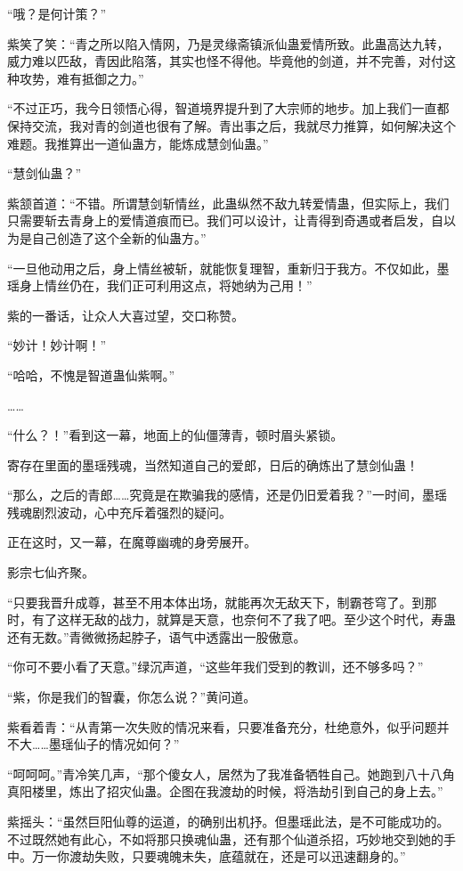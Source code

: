 \begin{this_body}
“哦？是何计策？”

紫笑了笑：“青之所以陷入情网，乃是灵缘斋镇派仙蛊爱情所致。此蛊高达九转，威力难以匹敌，青因此陷落，其实也怪不得他。毕竟他的剑道，并不完善，对付这种攻势，难有抵御之力。”

“不过正巧，我今日领悟心得，智道境界提升到了大宗师的地步。加上我们一直都保持交流，我对青的剑道也很有了解。青出事之后，我就尽力推算，如何解决这个难题。我推算出一道仙蛊方，能炼成慧剑仙蛊。”

“慧剑仙蛊？”

紫颔首道：“不错。所谓慧剑斩情丝，此蛊纵然不敌九转爱情蛊，但实际上，我们只需要斩去青身上的爱情道痕而已。我们可以设计，让青得到奇遇或者启发，自以为是自己创造了这个全新的仙蛊方。”

“一旦他动用之后，身上情丝被斩，就能恢复理智，重新归于我方。不仅如此，墨瑶身上情丝仍在，我们正可利用这点，将她纳为己用！”

紫的一番话，让众人大喜过望，交口称赞。

“妙计！妙计啊！”

“哈哈，不愧是智道蛊仙紫啊。”

……

“什么？！”看到这一幕，地面上的仙僵薄青，顿时眉头紧锁。

寄存在里面的墨瑶残魂，当然知道自己的爱郎，日后的确炼出了慧剑仙蛊！

“那么，之后的青郎……究竟是在欺骗我的感情，还是仍旧爱着我？”一时间，墨瑶残魂剧烈波动，心中充斥着强烈的疑问。

正在这时，又一幕，在魔尊幽魂的身旁展开。

影宗七仙齐聚。

“只要我晋升成尊，甚至不用本体出场，就能再次无敌天下，制霸苍穹了。到那时，有了这样无敌的战力，就算是天意，也奈何不了我了吧。至少这个时代，寿蛊还有无数。”青微微扬起脖子，语气中透露出一股傲意。

“你可不要小看了天意。”绿沉声道，“这些年我们受到的教训，还不够多吗？”

“紫，你是我们的智囊，你怎么说？”黄问道。

紫看着青：“从青第一次失败的情况来看，只要准备充分，杜绝意外，似乎问题并不大……墨瑶仙子的情况如何？”

“呵呵呵。”青冷笑几声，“那个傻女人，居然为了我准备牺牲自己。她跑到八十八角真阳楼里，炼出了招灾仙蛊。企图在我渡劫的时候，将浩劫引到自己的身上去。”

紫摇头：“虽然巨阳仙尊的运道，的确别出机抒。但墨瑶此法，是不可能成功的。不过既然她有此心，不如将那只换魂仙蛊，还有那个仙道杀招，巧妙地交到她的手中。万一你渡劫失败，只要魂魄未失，底蕴就在，还是可以迅速翻身的。”


\end{this_body}
